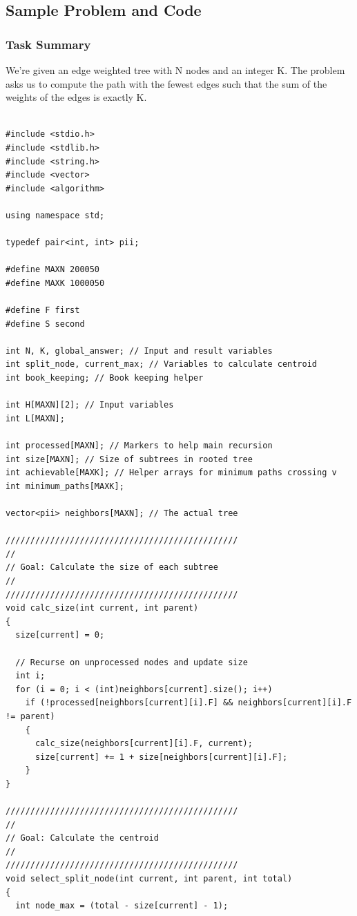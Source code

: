 \documentclass[12pt]{article}
\begin{document}
\subsection{Sample Problem and Code}

\subsubsection*{Task Summary}
We’re given an edge weighted tree with N nodes and an integer K. The problem asks us to compute the path with the fewest edges such that the sum of the weights of the edges is exactly K.\cite{10} \\

\begin{verbatim}

#include <stdio.h>
#include <stdlib.h>
#include <string.h>
#include <vector>
#include <algorithm>

using namespace std;

typedef pair<int, int> pii;

#define MAXN 200050
#define MAXK 1000050

#define F first
#define S second

int N, K, global_answer; // Input and result variables
int split_node, current_max; // Variables to calculate centroid
int book_keeping; // Book keeping helper

int H[MAXN][2]; // Input variables
int L[MAXN];

int processed[MAXN]; // Markers to help main recursion
int size[MAXN]; // Size of subtrees in rooted tree
int achievable[MAXK]; // Helper arrays for minimum paths crossing v
int minimum_paths[MAXK];

vector<pii> neighbors[MAXN]; // The actual tree

///////////////////////////////////////////////
//
// Goal: Calculate the size of each subtree
//
///////////////////////////////////////////////
void calc_size(int current, int parent)
{
  size[current] = 0;

  // Recurse on unprocessed nodes and update size
  int i;
  for (i = 0; i < (int)neighbors[current].size(); i++)
    if (!processed[neighbors[current][i].F] && neighbors[current][i].F != parent)
    {
      calc_size(neighbors[current][i].F, current);
      size[current] += 1 + size[neighbors[current][i].F];
    }
}

///////////////////////////////////////////////
//
// Goal: Calculate the centroid
//
///////////////////////////////////////////////
void select_split_node(int current, int parent, int total)
{
  int node_max = (total - size[current] - 1);


\end{verbatim}
\end{document}
